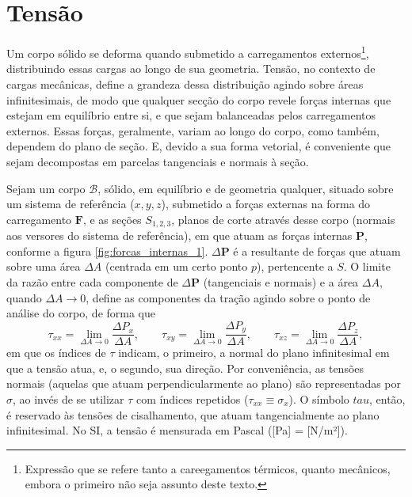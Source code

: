 \section{Tensão}
Um corpo sólido se deforma quando submetido a carregamentos externos\footnote{Expressão que se refere tanto a careegamentos térmicos, quanto mecânicos, embora o primeiro não seja assunto deste texto.}, distribuindo essas cargas ao longo de sua geometria. Tensão, no contexto de cargas mecânicas, define a grandeza dessa distribuição agindo sobre áreas infinitesimais, de modo que qualquer secção do corpo revele forças internas que estejam em equilíbrio entre si, e que sejam balanceadas pelos carregamentos externos. Essas forças, geralmente, variam ao longo do corpo, como também, dependem do plano de seção. E, devido a sua forma vetorial, é conveniente que sejam decompostas em parcelas tangenciais e normais à seção. \cite[pág. 60]{popov}



Sejam um corpo $\mathcal{B}$, sólido, em equilíbrio e de geometria qualquer, situado sobre um sistema de referência ($x, y, z$), submetido a forças externas na forma do carregamento $\bm{F}$, e as seções $S_{1,2,3}$, planos de corte através desse corpo (normais aos versores do sistema de referência), em que atuam as forças internas $\bm{P}$, conforme a figura \ref{fig:forcas_internas_1}. $\Delta \bm{P}$ é a resultante de forças que atuam sobre uma área $\Delta A$ (centrada em um certo ponto $p$), pertencente a $S$. O limite da razão entre cada componente de $\Delta \bm{P}$ (tangenciais e normais) e a área $\Delta A$, quando $\Delta A \to 0$, define as componentes da tração agindo sobre o ponto de análise do corpo, de forma que
\begin{equation}
    \tau_{xx} = \lim_{\Delta A \to 0} \frac{\Delta P_x}{\Delta A}, \qquad
    \tau_{xy} = \lim_{\Delta A \to 0} \frac{\Delta P_y}{\Delta A}, \qquad
    \tau_{xz} = \lim_{\Delta A \to 0} \frac{\Delta P_z}{\Delta A},
\end{equation}
em que os índices de $\tau$ indicam, o primeiro, a normal do plano infinitesimal em que a tensão atua, e, o segundo, sua direção. Por conveniência, as tensões normais (aquelas que atuam perpendicularmente ao plano) são representadas por $\sigma$, ao invés de se utilizar $\tau$ com índices repetidos ($\tau_{xx} \equiv \sigma_x$). O símbolo $tau$, então, é reservado às tensões de cisalhamento, que atuam tangencialmente ao plano infinitesimal. No SI, a tensão é mensurada em Pascal ([Pa] = [N/m²]).

